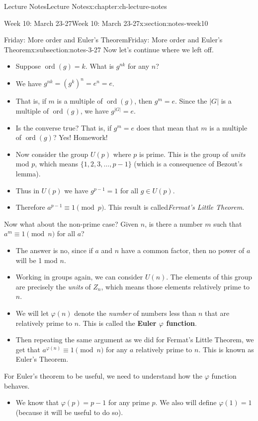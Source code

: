 \documentclass[oneside,11pt,]{book}
\newcommand{\terminology}[1]{\textbf{#1}}
\DeclareMathOperator{\ord}{ord}
\begin{document}
\begin{chapterptx}{Lecture Notes}{}{Lecture Notes}{}{}{x:chapter:ch-lecture-notes}
\begin{sectionptx}{Week 10: March 23-27}{}{Week 10: March 23-27}{}{}{x:section:notes-week10}
\begin{subsectionptx}{Friday: More order and Euler's Theorem}{}{Friday: More order and Euler's Theorem}{}{}{x:subsection:notes-3-27}
Now let's continue where we left off.%
\begin{itemize}[label=\textbullet]
\item{}Suppose \(\ord(g) = k\).  What is \(g^{nk}\) for any \(n\)?%
\item{}We have \(g^{nk} = (g^k)^n = e^n = e\).%
\item{}That is, if \(m\) is a multiple of \(\ord(g)\), then \(g^m = e\).  Since the \(|G|\) is a multiple of \(\ord(g)\), we have \(g^{|G|} = e\).%
\item{}Is the converse true?  That is, if \(g^m = e\) does that mean that \(m\) is a multiple of \(\ord(g)\)?  Yes!  Homework!%
\item{}Now consider the group \(U(p)\) where \(p\) is prime.  This is the group of \emph{units} mod \(p\), which means \(\{1,2,3,\ldots, p-1\}\) (which is a consequence of Bezout's lemma).%
\item{}Thus in \(U(p)\) we have \(g^{p-1} = 1\) for all \(g \in U(p)\).%
\item{}Therefore \(a^{p-1} \equiv 1 \pmod{p}\).  This result is called\emph{Fermat's Little Theorem}.%
\end{itemize}
%
\par
Now what about the non-prime case?  Given \(n\), is there a number \(m\) such that \(a^m \equiv 1 \pmod{n}\) for all \(a\)?%
\begin{itemize}[label=\textbullet]
\item{}The answer is no, since if \(a\) and \(n\) have a common factor, then no power of \(a\) will be 1 mod \(n\).%
\item{}Working in groups again, we can consider \(U(n)\).  The elements of this group are precisely the \emph{units} of \(Z_n\), which means those elements relatively prime to \(n\).%
\item{}We will let \(\varphi(n)\) denote the \emph{number} of numbers less than \(n\) that are relatively prime to \(n\).  This is called the \terminology{Euler \(\varphi\) function}.%
\item{}Then repeating the same argument as we did for Fermat's Little Theorem, we get that \(a^{\varphi(n)} \equiv 1 \pmod{n}\) for any \(a\) relatively prime to \(n\).  This is known as Euler's Theorem.%
\end{itemize}
%
\par
For Euler's theorem to be useful, we need to understand how the \(\varphi\) function behaves.%
\begin{itemize}[label=\textbullet]
\item{}We know that \(\varphi(p) = p-1\) for any prime \(p\).  We also will define \(\varphi(1) = 1\) (because it will be useful to do so).%

\end{itemize}
\end{subsectionptx}
\end{sectionptx}
\end{chapterptx}
\end{document}
